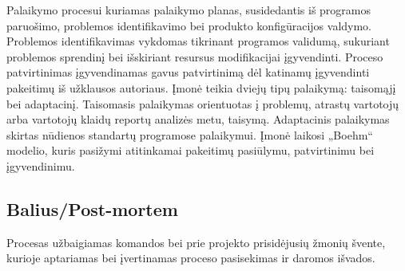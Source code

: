 \documentclass{VUMIFPSkursinis}
\begin{document}
	Palaikymo procesui kuriamas palaikymo planas, susidedantis iš programos paruošimo, problemos identifikavimo bei produkto konfigūracijos valdymo. Problemos identifikavimas vykdomas tikrinant programos validumą, sukuriant problemos sprendinį bei išskiriant resursus modifikacijai įgyvendinti. Proceso patvirtinimas įgyvendinamas gavus patvirtinimą dėl katinamų įgyvendinti pakeitimų iš užklausos autoriaus. Įmonė teikia dviejų tipų palaikymą: taisomąjį bei adaptacinį. Taisomasis palaikymas orientuotas į problemų, atrastų vartotojų arba vartotojų klaidų reportų analizės metu, taisymą. Adaptacinis palaikymas skirtas nūdienos standartų programose palaikymui. Įmonė laikosi „Boehm“ modelio, kuris pasižymi atitinkamai pakeitimų pasiūlymu, patvirtinimu bei įgyvendinimu.
	\label{img:boehmsModel} 

	\subsection{Balius/Post-mortem}
	Procesas užbaigiamas komandos bei prie projekto prisidėjusių žmonių švente, kurioje aptariamas bei įvertinamas proceso pasisekimas ir daromos išvados.
\end{document}
